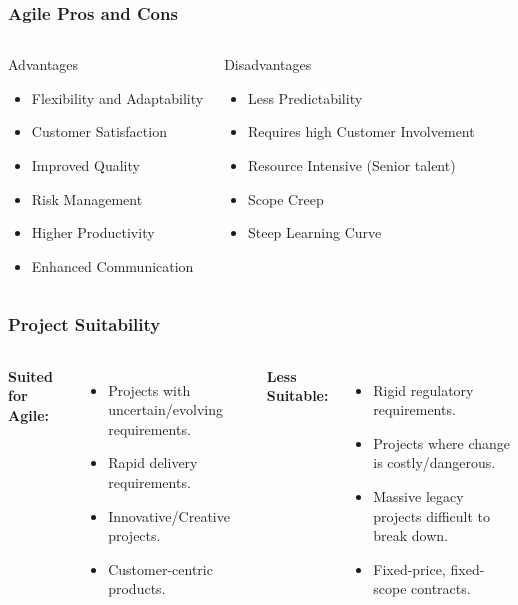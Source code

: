 \documentclass[xcolor=table]{beamer}
\begin{document}
\begin{frame}
    \frametitle{Agile Pros and Cons}
    \begin{columns}
        \begin{block}{Advantages}
            \begin{itemize}
                \item Flexibility and Adaptability
                \item Customer Satisfaction
                \item Improved Quality
                \item Risk Management
                \item Higher Productivity
                \item Enhanced Communication
            \end{itemize}
        \end{block}

        \begin{alertblock}{Disadvantages}
            \begin{itemize}
                \item Less Predictability
                \item Requires high Customer Involvement
                \item Resource Intensive (Senior talent)
                \item Scope Creep
                \item Steep Learning Curve
            \end{itemize}
        \end{alertblock}
    \end{columns}
\end{frame}

\begin{frame}
    \frametitle{Project Suitability}
    \begin{columns}
        \textbf{Suited for Agile:}
        \begin{itemize}
            \item Projects with uncertain/evolving requirements.
            \item Rapid delivery requirements.
            \item Innovative/Creative projects.
            \item Customer-centric products.
        \end{itemize}

        \textbf{Less Suitable:}
        \begin{itemize}
            \item Rigid regulatory requirements.
            \item Projects where change is costly/dangerous.
            \item Massive legacy projects difficult to break down.
            \item Fixed-price, fixed-scope contracts.
        \end{itemize}
    \end{columns}
\end{frame}
\end{document}
